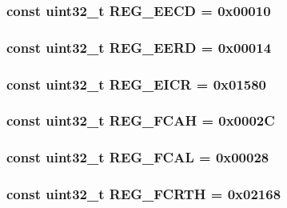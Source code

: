 \label{namespaceiGbReg_aee737b7c1f7c88ebd5f043dd77266f7b}
\hypertarget{namespaceiGbReg_af673fadbe51cbe2b7e87961c48ef5180}{
\subsubsection[{REG\_\-EECD}]{\setlength{\rightskip}{0pt plus 5cm}const {\bf uint32\_\-t} {\bf REG\_\-EECD} = 0x00010}}
\label{namespaceiGbReg_af673fadbe51cbe2b7e87961c48ef5180}
\hypertarget{namespaceiGbReg_a5dcdf9f0dc751450a4395fbd2657cd7f}{
\subsubsection[{REG\_\-EERD}]{\setlength{\rightskip}{0pt plus 5cm}const {\bf uint32\_\-t} {\bf REG\_\-EERD} = 0x00014}}
\label{namespaceiGbReg_a5dcdf9f0dc751450a4395fbd2657cd7f}
\hypertarget{namespaceiGbReg_a96b0b26da65a0436503fc82ab3cf9ad3}{
\subsubsection[{REG\_\-EICR}]{\setlength{\rightskip}{0pt plus 5cm}const {\bf uint32\_\-t} {\bf REG\_\-EICR} = 0x01580}}
\label{namespaceiGbReg_a96b0b26da65a0436503fc82ab3cf9ad3}
\hypertarget{namespaceiGbReg_a27cbb3863547fdf28582267066bb6f8f}{
\subsubsection[{REG\_\-FCAH}]{\setlength{\rightskip}{0pt plus 5cm}const {\bf uint32\_\-t} {\bf REG\_\-FCAH} = 0x0002C}}
\label{namespaceiGbReg_a27cbb3863547fdf28582267066bb6f8f}
\hypertarget{namespaceiGbReg_a8a594fcc2df76c0809c21dcb8c2968e4}{
\subsubsection[{REG\_\-FCAL}]{\setlength{\rightskip}{0pt plus 5cm}const {\bf uint32\_\-t} {\bf REG\_\-FCAL} = 0x00028}}
\label{namespaceiGbReg_a8a594fcc2df76c0809c21dcb8c2968e4}
\hypertarget{namespaceiGbReg_a9035848a36c2d1c1dabebf2c06e48ec4}{
\subsubsection[{REG\_\-FCRTH}]{\setlength{\rightskip}{0pt plus 5cm}const {\bf uint32\_\-t} {\bf REG\_\-FCRTH} = 0x02168}}
